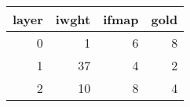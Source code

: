 \begin{tabular}{rrrr}
\toprule
 layer &  iwght &  ifmap &  gold \\
\midrule
     0 &      1 &      6 &     8 \\
     1 &     37 &      4 &     2 \\
     2 &     10 &      8 &     4 \\
\bottomrule
\end{tabular}
